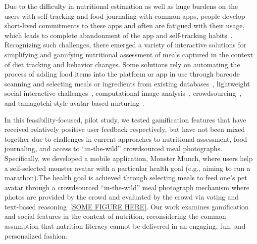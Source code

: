 

Due to the difficulty in nutritional estimation %
as well as huge burdens on the users with self-tracking and food journaling with common apps, people develop short-lived commitments to these apps and often are fatigued with their usage, which leads to complete abandonment of the app and self-tracking habits~\cite{choe2014understanding,Cordeiro:2015:RMF:2702123.2702154,cordeiro2015barriers,epstein2016crumbs,mattila2008mobile}.
Recognizing such challenges, there emerged a variety of interactive solutions for simplifying and gamifying nutritional assessment of meals captured in the context of diet tracking and behavior changes. Some solutions rely on automating the process of adding food items into the platform or app in use through barcode scanning and selecting meals or ingredients from existing databases~\cite{beijbom2015menu,bomfim2018pirate,bomfim2020food,siek2009evaluation}, lightweight social interactive challenges~\cite{Cordeiro:2015:RMF:2702123.2702154,epstein2016crumbs}, 
computational image analysis~\cite{anthimopoulos2015computer,kong2012dietcam,rhyner2016carbohydrate,zhang2015snap,zhu2010use}, crowdsourcing~\cite{mamykina2011examining,noronha2011platemate}, and tamagotchi-style avatar based nurturing~\cite{byrne2012caring,hwang2017monster,lin2006fish}.

In this feasibility-focused, pilot study, we tested gamification features that have received relatively positive user feedback respectively, but have not been mixed together due to challenges in current approaches to nutritional assessment, food journaling, and access to ``in-the-wild'' crowdsourced meal photographs. Specifically, we developed a mobile application, Monster Munch, where users help a self-selected monster avatar with a particular health goal (e.g., aiming to run a marathon).The health goal is achieved through selecting meals to feed one's pet avatar through a crowdsourced “in-the-wild” meal photograph mechanism where photos are provided by the crowd and evaluated by the crowd via voting and text-based reasoning~\ref{SOME FIGURE HERE}. Our work examines gamification and social features in the context of nutrition, reconsidering the common assumption that nutrition literacy cannot be delivered in an engaging, fun, and personalized fashion. 

